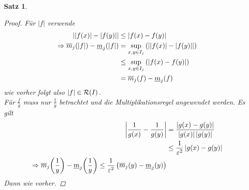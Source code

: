 \documentclass[11pt, twoside, a4paper]{article}
\theoremstyle{plain}
\newtheorem{satz}[blockelement]{Satz}
\numberwithin{equation}{subsection}
\newcommand{\pair}[1]{\left(#1\right)}
\newcommand{\of}[1]{\mathopen{}\mathclose{}\bgroup\left(#1\aftergroup\egroup\right)}
\newcommand{\abs}[1]{\left\lvert#1\right\rvert}
\newcommand{\impl}[0]{\Rightarrow{}}
\newcommand{\mR}{\mathcal{R}}
\begin{document}
\begin{satz}
\begin{proof}
            Für $\abs{f}$ verwende
            \begin{align*}
                \abs{\abs{f(x)}- \abs{f(y)}} &\leq \abs{f(x) - f(y)}\\
                \impl \overline{m}_j\of{\abs{f}} - \underline{m}_j\of{\abs{f}} &= \sup_{x,y\in I_j}\pair{\abs{\abs{f(x)} - \abs{f(y)}}}\\
                &\leq \sup_{x,y\in I_j} \pair{\abs{f(x)-f(y)}}\\
                &= \overline{m}_j\of{f} - \underline{m}_j\of{f}
            \end{align*}
            wie vorher folgt also $\abs{f} \in \mR\of{I}$.\\
            Für $\frac{f}{g}$ muss nur $\frac{1}{g}$ betrachtet und die Multiplikationsregel angewendet werden. Es gilt
            \begin{align*}
                \abs{\frac{1}{g(x)}- \frac{1}{g(y)}} &= \frac{\abs{g(x)-g(y)}}{\abs{g(x)}\abs{g(y)}}\\
                &\leq \frac{1}{\varepsilon^2}\abs{g(x) - g(y)}\\
                \impl \overline{m}_j\of{\frac{1}{y}}  - \underline{m}_j\of{\frac{1}{y}} \leq \frac{1}{\varepsilon^2} \pair{\overline{m}_j\of{y} - \underline{m}_j\of{y}}
            \end{align*}
            Dann wie vorher.\qedhere
        \end{proof}
    \end{satz}
\end{document}
